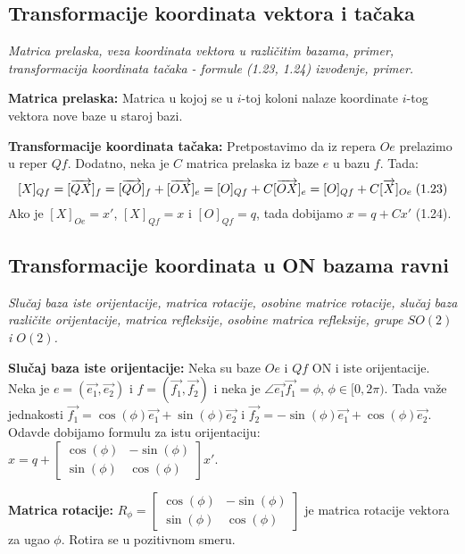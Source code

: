 \documentclass[12pt]{article}
\newcommand{\vek}[1]{\overrightarrow{#1}}
\begin{document}
\subsection{Transformacije koordinata vektora i tačaka}
\textit{Matrica prelaska, veza koordinata vektora u različitim bazama,
    primer, transformacija koordinata tačaka - formule (1.23, 1.24)
    izvođenje, primer.}
\par
\vspace*{1cm}

\textbf{Matrica prelaska:} Matrica u kojoj se u $i$-toj koloni nalaze
koordinate $i$-tog vektora nove baze u staroj bazi.
\par

\textbf{Transformacije koordinata tačaka:} Pretpostavimo da iz repera $Oe$
prelazimo u reper $Qf$. Dodatno, neka je $C$ matrica prelaska iz baze $e$ u
bazu $f$. Tada:
$$[X]_{Qf} =[\vek{QX}]_f =[\vek{QO}]_f+[\vek{OX}]_e =[O]_{Qf}+C[\vek{OX}]_e =[O]_{Qf}+C[\vek{X}]_{Oe} \hspace*{0.1cm}\text{(1.23)}$$
Ako je $[X]_{Oe}=x'$, $[X]_{Qf}=x$ i $[O]_{Qf}=q$, tada dobijamo $x=q+Cx'$ (1.24).

\subsection{Transformacije koordinata u ON bazama ravni}
\label{subsec:pitanje_9}
\textit{Slučaj baza iste orijentacije, matrica rotacije, osobine matrice
    rotacije, slučaj baza različite orijentacije, matrica refleksije,
    osobine matrica refleksije, grupe $SO(2)$ i $O(2)$.}
\par

\vspace*{1cm}

\textbf{Slučaj baza iste orijentacije:} Neka su baze $Oe$ i $Qf$ ON i iste
orijentacije. Neka je $e=(\vek{e_1},\vek{e_2})$ i $f=(\vek{f_1},\vek{f_2})$ i
neka je $\angle{\vek{e_1}\vek{f_1}}=\phi$, $\phi\in[0,2\pi)$.
Tada važe jednakosti $\vek{f_1}=\cos(\phi)\vek{e_1}+\sin(\phi)\vek{e_2}$ i
$\vek{f_2}=-\sin(\phi)\vek{e_1}+\cos(\phi)\vek{e_2}$. Odavde dobijamo formulu
za istu orijentaciju: $x=q+\begin{bmatrix}
        \cos(\phi) & -\sin(\phi) \\
        \sin(\phi) & \cos(\phi)
    \end{bmatrix} x'$.
\par

\textbf{Matrica rotacije:} $R_\phi=\begin{bmatrix}
        \cos(\phi) & -\sin(\phi) \\
        \sin(\phi) & \cos(\phi)
    \end{bmatrix}$ je matrica rotacije vektora za ugao $\phi$. Rotira se u
pozitivnom smeru.
\par
\end{document}
